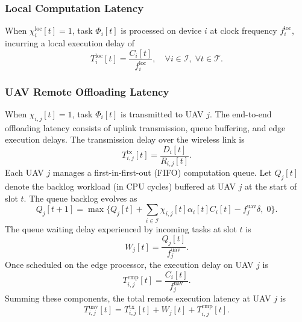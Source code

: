 \documentclass[journal]{IEEEtran}
\begin{document}
\subsubsection{Local Computation Latency}
When $\chi_i^{\mathrm{loc}}[t] = 1$, task $\Phi_i[t]$ is processed on device $i$ at clock frequency $f_i^{\mathrm{loc}}$, incurring a local execution delay of
\begin{equation}
    T_i^{\mathrm{loc}}[t] = \frac{C_i[t]}{f_i^{\mathrm{loc}}}, \quad \forall i \in \mathcal{I}, \; \forall t \in \mathcal{T}.
    \label{eq:local_delay}
\end{equation}

\subsubsection{UAV Remote Offloading Latency}
When $\chi_{i,j}[t] = 1$, task $\Phi_i[t]$ is transmitted to UAV $j$. The end-to-end offloading latency consists of uplink transmission, queue buffering, and edge execution delays. The transmission delay over the wireless link is
\begin{equation}
    T_{i,j}^{\mathrm{tx}}[t] = \frac{D_i[t]}{R_{i,j}[t]}.
    \label{eq:tx_delay}
\end{equation}
Each UAV $j$ manages a first-in-first-out (FIFO) computation queue. Let $Q_j[t]$ denote the backlog workload (in CPU cycles) buffered at UAV $j$ at the start of slot $t$. The queue backlog evolves as
\begin{equation}
    Q_j[t+1] = \max\Biggl\{Q_j[t] + \sum_{i \in \mathcal{I}} \chi_{i,j}[t] \alpha_i[t] C_i[t] - f_j^{\mathrm{uav}}\delta, \; 0\Biggr\}.
    \label{eq:queue_update}
\end{equation}
The queue waiting delay experienced by incoming tasks at slot $t$ is
\begin{equation}
    W_j[t] = \frac{Q_j[t]}{f_j^{\mathrm{uav}}}.
    \label{eq:queue_delay}
\end{equation}
Once scheduled on the edge processor, the execution delay on UAV $j$ is
\begin{equation}
    T_{i,j}^{\mathrm{cmp}}[t] = \frac{C_i[t]}{f_j^{\mathrm{uav}}}.
    \label{eq:uav_cmp_delay}
\end{equation}
Summing these components, the total remote execution latency at UAV $j$ is
\begin{equation}
    T_{i,j}^{\mathrm{uav}}[t] = T_{i,j}^{\mathrm{tx}}[t] + W_j[t] + T_{i,j}^{\mathrm{cmp}}[t].
    \label{eq:total_uav_delay}
\end{equation}
\end{document}
